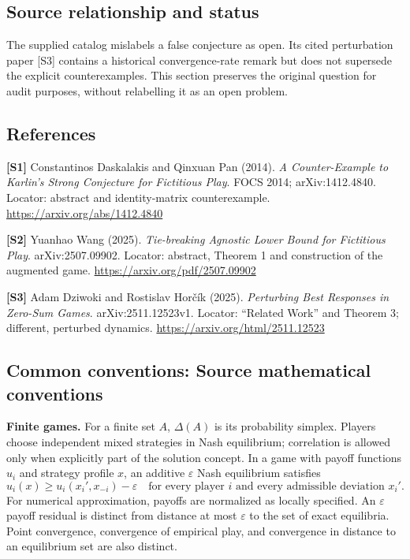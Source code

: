 \documentclass[11pt,a4paper]{article}
\begin{document}
\subsection*{Source relationship and status}
The supplied catalog mislabels a false conjecture as open. Its cited perturbation paper [S3] contains a historical convergence-rate remark but does not supersede the explicit counterexamples. This section preserves the original question for audit purposes, without relabelling it as an open problem.
\subsection*{References}
\begingroup\footnotesize\raggedright
{\footnotesize\raggedright
\textbf{[S1]} Constantinos Daskalakis and Qinxuan Pan (2014). \emph{A Counter-Example to Karlin's Strong Conjecture for Fictitious Play}. FOCS 2014; arXiv:1412.4840. Locator: abstract and identity-matrix counterexample. \url{https://arxiv.org/abs/1412.4840}\par
\textbf{[S2]} Yuanhao Wang (2025). \emph{Tie-breaking Agnostic Lower Bound for Fictitious Play}. arXiv:2507.09902. Locator: abstract, Theorem 1 and construction of the augmented game. \url{https://arxiv.org/pdf/2507.09902}\par
\textbf{[S3]} Adam Dziwoki and Rostislav Hor\v{c}\'ik (2025). \emph{Perturbing Best Responses in Zero-Sum Games}. arXiv:2511.12523v1. Locator: ``Related Work'' and Theorem 3; different, perturbed dynamics. \url{https://arxiv.org/html/2511.12523}\par}
\par\endgroup

\subsection*{Common conventions: Source mathematical conventions}

\textbf{Finite games.} For a finite set $A$, $\Delta(A)$ is its probability
simplex. Players choose independent mixed strategies in Nash equilibrium;
correlation is allowed only when explicitly part of the solution concept.
In a game with payoff functions $u_i$ and strategy profile $x$, an additive
$\varepsilon$ Nash equilibrium satisfies
\[
 u_i(x)\geq u_i(x_i',x_{-i})-\varepsilon
 \quad\text{for every player $i$ and every admissible deviation $x_i'$}.
\]
For numerical approximation, payoffs are normalized as locally specified.
An $\varepsilon$ payoff residual is distinct from distance at most
$\varepsilon$ to the set of exact equilibria. Point convergence, convergence
of empirical play, and convergence in distance to an equilibrium set are
also distinct.
\end{document}
